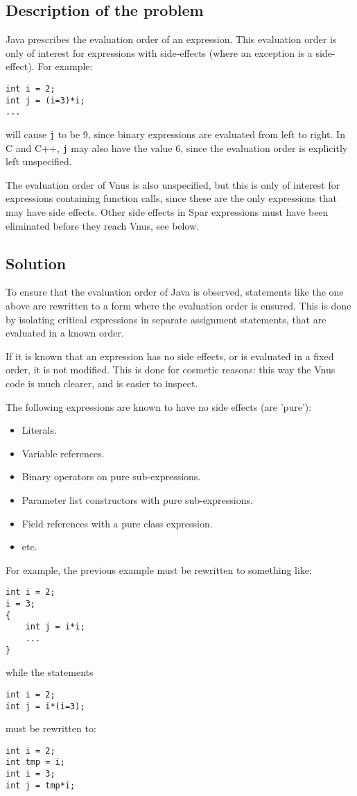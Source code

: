 \documentclass{article}
\begin{document}
\subsection{Description of the problem}
Java prescribes the evaluation order of an expression. This evaluation
order is only of interest for expressions with side-effects (where an
exception is a side-effect).
For example:
\begin{verbatim}
int i = 2;
int j = (i=3)*i;
...
\end{verbatim}
will cause \verb'j' to be 9, since binary expressions are evaluated
from left to right. In C and C++, \verb'j' may also have the value 6,
since the evaluation order is explicitly left unspecified.

The evaluation order of Vnus is also unspecified, but this is only of
interest for expressions containing function calls, since these are the
only expressions that may have side effects. Other side effects in
Spar expressions must have been eliminated before they reach Vnus,
see below.

\subsection{Solution}
To ensure that the evaluation order of Java is observed, statements
like the one above are rewritten to a form where the evaluation order
is ensured. This is done by isolating critical expressions in separate
assignment statements, that are evaluated in a known order.

If it is known that an expression has no side effects, or is evaluated
in a fixed order, it is not modified. This is done for cosmetic reasons:
this way the Vnus code is much clearer, and is easier to inspect.

The following expressions are known to have no side effects (are 'pure'):
\begin{itemize}
\item Literals.
\item Variable references.
\item Binary operators on pure sub-expressions.
\item Parameter list constructors with pure sub-expressions.
\item Field references with a pure class expression.
\item etc.
\end{itemize}

For example, the previous example must be rewritten to something like:
\begin{verbatim}
int i = 2;
i = 3;
{
    int j = i*i;
    ...
}
\end{verbatim}
while the statements
\begin{verbatim}
int i = 2;
int j = i*(i=3);
\end{verbatim}
must be rewritten to:
\begin{verbatim}
int i = 2;
int tmp = i;
int i = 3;
int j = tmp*i;
\end{verbatim}
\end{document}
